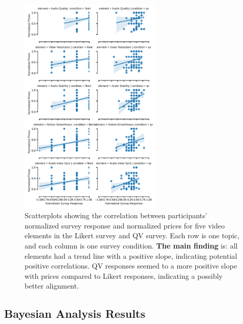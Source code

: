 \begin{figure}[htpb]
    \centering
    \includegraphics[width=0.6\textwidth, keepaspectratio=true]{content/image/correlation_per_element.pdf}
    \caption{
      Scatterplots showing the correlation between participants' normalized survey response and normalized prices for five video elements in the Likert survey and QV survey. Each row is one topic, and each column is one survey condition. \textbf{The main finding} is: all elements had a trend line with a positive slope, indicating potential positive correlations. QV responses seemed to {} a more positive slope with prices compared to Likert responses, indicating a possibly better alignment.
    }
    \label{fig:topic_covariate_exp2}
\end{figure}


\subsection{Bayesian Analysis Results}


